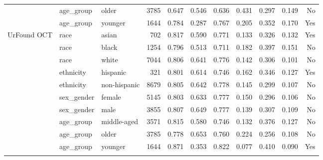 \begin{longtable}{@{}lllrrrrrrrr@{}}
 & age\_group & older & 3785 & 0.647 & 0.546 & 0.636 & 0.431 & 0.297 & 0.149 & No \\
 & age\_group & younger & 1644 & 0.784 & 0.287 & 0.767 & 0.205 & 0.352 & 0.170 & Yes \\
UrFound OCT & race & asian & 702 & 0.817 & 0.590 & 0.771 & 0.133 & 0.326 & 0.132 & Yes \\
 & race & black & 1254 & 0.796 & 0.513 & 0.711 & 0.182 & 0.397 & 0.151 & No \\
 & race & white & 7044 & 0.806 & 0.641 & 0.776 & 0.142 & 0.306 & 0.101 & No \\
 & ethnicity & hispanic & 321 & 0.801 & 0.614 & 0.746 & 0.162 & 0.346 & 0.127 & Yes \\
 & ethnicity & non-hispanic & 8679 & 0.805 & 0.642 & 0.778 & 0.145 & 0.299 & 0.107 & No \\
 & sex\_gender & female & 5145 & 0.803 & 0.633 & 0.777 & 0.150 & 0.296 & 0.106 & No \\
 & sex\_gender & male & 3855 & 0.807 & 0.649 & 0.777 & 0.139 & 0.307 & 0.109 & No \\
 & age\_group & middle-aged & 3571 & 0.815 & 0.580 & 0.746 & 0.132 & 0.376 & 0.127 & No \\
 & age\_group & older & 3785 & 0.778 & 0.653 & 0.760 & 0.224 & 0.256 & 0.108 & No \\
 & age\_group & younger & 1644 & 0.871 & 0.353 & 0.822 & 0.077 & 0.410 & 0.090 & Yes \\
\botrule
\end{longtable}
